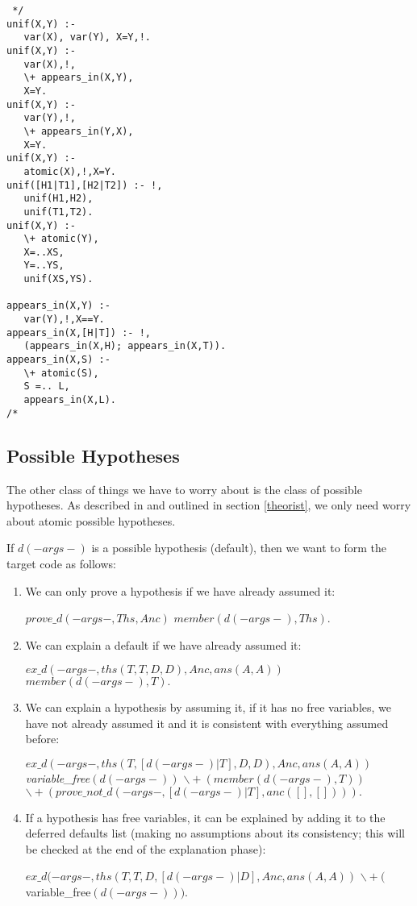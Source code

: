 \begin{verbatim} */
unif(X,Y) :-
   var(X), var(Y), X=Y,!.
unif(X,Y) :-
   var(X),!,
   \+ appears_in(X,Y),
   X=Y.
unif(X,Y) :-
   var(Y),!,
   \+ appears_in(Y,X),
   X=Y.
unif(X,Y) :-
   atomic(X),!,X=Y.
unif([H1|T1],[H2|T2]) :- !,
   unif(H1,H2),
   unif(T1,T2).
unif(X,Y) :-
   \+ atomic(Y),
   X=..XS,
   Y=..YS,
   unif(XS,YS).

appears_in(X,Y) :-
   var(Y),!,X==Y.
appears_in(X,[H|T]) :- !,
   (appears_in(X,H); appears_in(X,T)).
appears_in(X,S) :-
   \+ atomic(S),
   S =.. L,
   appears_in(X,L).
/* \end{verbatim}
\subsection{Possible Hypotheses}
The other class of things we have to worry about is the class
of possible hypotheses. As described in \cite{poole:lf}
and outlined in section \ref{theorist},
we only need worry about atomic possible hypotheses.

If $d(-args-)$ is a possible hypothesis (default),
then we want to form the target code as follows:

\begin{enumerate}
\item We can only prove a hypothesis if we have already assumed it:
\begin{prolog}
$prove\_d(-args-,Ths,Anc) $\IF
$member(d(-args-),Ths).$
\end{prolog}
\item We can explain a default if we have already assumed it:
\begin{prolog}
$ex\_d(-args-,ths(T,T,D,D),Anc,ans(A,A)) $\IF
$member(d(-args-),T).$
\end{prolog}
\item We can explain a hypothesis by assuming it,
if it has no free variables, we have not
already assumed it and it is consistent with everything assumed before:
\begin{prolog} \em
$ex\_d(-args-,ths(T,[d(-args-)|T],D,D),Anc,ans(A,A)) $\IF
variable\_free$(d(-args-))$\AND
$\backslash+(member(d(-args-),T))$\AND
$\backslash+(prove\_not\_d(-args-,[d(-args-)|T],anc([],[]))).$
\end{prolog}
\item 
If a hypothesis has free variables, it can be explained
by adding it to the deferred defaults list (making no assumptions about
its consistency; this will be checked at the end of the explanation phase):
\begin{prolog}
$ex\_d(-args-,ths(T,T,D,[d(-args-)|D],Anc,ans(A,A)) $\IF
$\backslash+($variable\_free$(d(-args-))).$
\end{prolog}
\end{enumerate}

